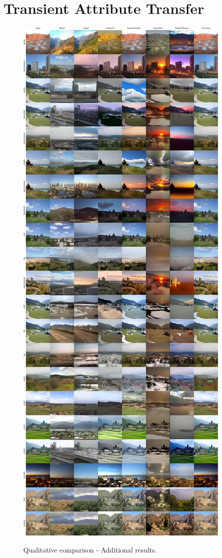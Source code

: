 \chapter{Transient Attribute Transfer}
\label{TAT:add_res}


\begin{figure}[ht]
  \centering
  {\includegraphics[width=0.95\linewidth]{Chapters/appendix-figs/TAT-compressed.pdf}}

   \caption{Qualitative comparison - Additional results.}
   \label{fig:appendix-tat1}
\end{figure}

